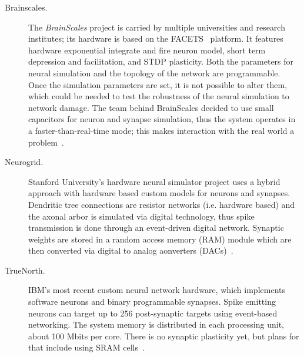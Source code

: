 \begin{description}
  

\item[Brainscales.] The \emph{BrainScales} project is carried by multiple universities and research institutes; its hardware is based on the FACETS~ platform\cite{brainscales-schemmel2010wafer}. It features hardware exponential integrate and fire neuron model, short term depression and facilitation, and STDP plasticity. Both the parameters for neural simulation and the topology of the network are programmable. Once the simulation parameters are set, it is not possible to alter them, which could be needed to test the robustness of the neural simulation to network damage. The team behind BrainScales decided to use small capacitors for neuron and synapse simulation, thus the system operates in a faster-than-real-time mode; this makes interaction with the real world a problem~\cite{neuro-platforms-summary-7159144,brainscales-homepage}. 

\item[Neurogrid.] Stanford University's hardware neural simulator project uses a hybrid approach with hardware based custom models for neurons and synapses. Dendritic tree connections are resistor networks (i.e. hardware based) and the axonal arbor is simulated via  digital technology, thus spike transmission is done through an event-driven digital network. Synaptic weights are stored in a random access memory (RAM) module which are then converted via  digital to analog aonverters (DACs)~\cite{neurogrid-6805187}. 

\item[TrueNorth.] IBM's most recent custom neural network hardware, which implements software neurons and binary programmable synapses. Spike emitting neurons can target up to 256 post-synaptic targets using event-based networking. The system memory is distributed in each processing unit, about 100 Mbits per core. There is no synaptic plasticity yet, but plans for that include using SRAM cells~\cite{truenorth-web}. 


\end{description}

